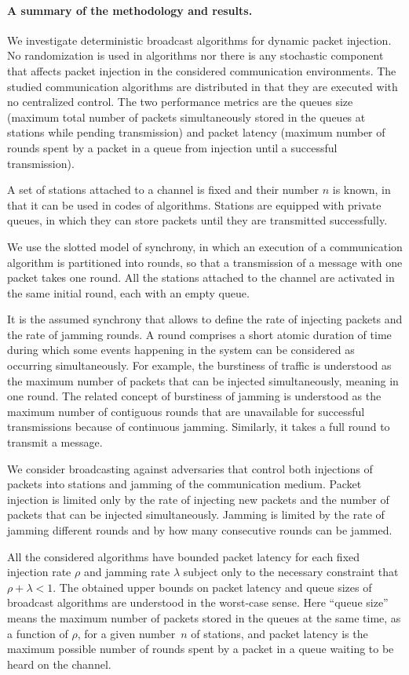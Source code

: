 \documentclass[11pt]{article}
\newcommand{\BBB}{\vspace*{-\bigskipamount}}
\newcommand{\Paragraph}[1]{\BBB\paragraph{#1}}
\begin{document}
\Paragraph{A summary of the methodology and results.}



We investigate deterministic broadcast algorithms for dynamic packet injection.
No randomization is used in algorithms nor there is any stochastic component that affects packet injection in the considered communication environments.
The studied communication algorithms are distributed in that they are executed with no centralized control. 
The two performance metrics are the queues size (maximum total number of packets simultaneously stored in the queues at stations while pending transmission) and packet latency (maximum number of rounds spent by a packet in a queue from injection until a successful transmission).

A set of stations attached to a channel is fixed and their number $n$ is known, in that it can be used in codes of algorithms.
Stations are equipped with private queues, in which they can store packets until they are transmitted successfully.

We use the slotted model of synchrony, in which an execution of a communication algorithm is partitioned into rounds, so that a transmission of a message with one packet  takes one round.
All the stations attached to the channel are  activated in the same initial round, each with an empty queue. 

It is the assumed synchrony that allows to define the rate of injecting packets and  the rate of jamming rounds.
A round comprises a short atomic duration of time during which some events happening in the system can be considered as occurring simultaneously.
For example, the burstiness of traffic is understood as the maximum number of packets that can be injected simultaneously, meaning in one round.
The related concept of burstiness of jamming is understood as the maximum number of contiguous rounds that are unavailable for successful transmissions because of continuous jamming. 
Similarly, it takes a full round to transmit a message.

We consider broadcasting against adversaries that control both injections of packets into stations and jamming of the communication medium.
Packet injection is  limited only by the rate of injecting new packets and the number of packets that can be injected simultaneously.
Jamming is limited by the rate of jamming different rounds and by how many consecutive rounds can be jammed.




All the considered algorithms have bounded packet latency for each fixed injection rate $\rho$ and jamming rate $\lambda$ subject only to the necessary constraint that $\rho+\lambda<1$.
The obtained upper bounds on packet latency and queue sizes of broadcast algorithms are understood in the worst-case sense.
Here  ``queue size'' means the maximum number of packets stored in the queues at the same time, as a function of $\rho$, for a given number~$n$ of stations, and packet latency is the maximum possible number of rounds spent by a packet in a queue waiting to be heard on the channel.
\end{document}

